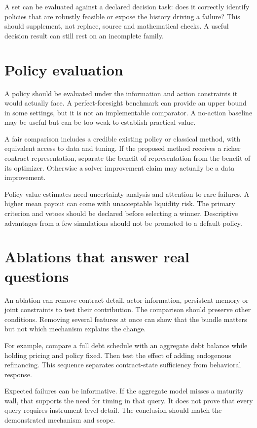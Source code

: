 A set can be evaluated against a declared decision task: does it correctly identify policies that are robustly feasible or expose the history driving a failure? This should supplement, not replace, source and mathematical checks. A useful decision result can still rest on an incomplete family.

\section{Policy evaluation}
A policy should be evaluated under the information and action constraints it would actually face. A perfect-foresight benchmark can provide an upper bound in some settings, but it is not an implementable comparator. A no-action baseline may be useful but can be too weak to establish practical value.

A fair comparison includes a credible existing policy or classical method, with equivalent access to data and tuning. If the proposed method receives a richer contract representation, separate the benefit of representation from the benefit of its optimizer. Otherwise a solver improvement claim may actually be a data improvement.

Policy value estimates need uncertainty analysis and attention to rare failures. A higher mean payout can come with unacceptable liquidity risk. The primary criterion and vetoes should be declared before selecting a winner. Descriptive advantages from a few simulations should not be promoted to a default policy.

\section{Ablations that answer real questions}
An ablation can remove contract detail, actor information, persistent memory or joint constraints to test their contribution. The comparison should preserve other conditions. Removing several features at once can show that the bundle matters but not which mechanism explains the change.

For example, compare a full debt schedule with an aggregate debt balance while holding pricing and policy fixed. Then test the effect of adding endogenous refinancing. This sequence separates contract-state sufficiency from behavioral response.

Expected failures can be informative. If the aggregate model misses a maturity wall, that supports the need for timing in that query. It does not prove that every query requires instrument-level detail. The conclusion should match the demonstrated mechanism and scope.

